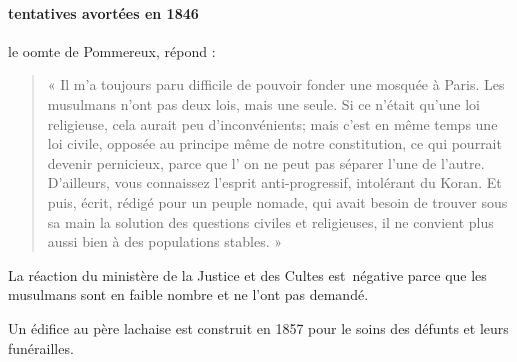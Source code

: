 \paragraph{tentatives avortées en 1846}
le oomte de Pommereux, répond : 
\begin{quote}
« Il m'a
toujours paru difficile de pouvoir fonder une mosquée à Paris. Les
musulmans n'ont pas deux lois, mais une seule. Si ce n'était
qu'une loi religieuse, cela aurait peu d'inconvénients; mais c'est
en même temps une loi civile, opposée au principe même de notre
constitution, ce qui pourrait devenir pernicieux, parce que l' on ne
peut pas séparer l'une de l'autre. D'ailleurs, vous connaissez
l'esprit anti-progressif, intolérant du Koran. Et puis, écrit, rédigé
pour un peuple nomade, qui avait besoin de trouver sous sa main
la solution des questions civiles et religieuses, il ne convient plus
aussi bien à des populations stables. »
\end{quote}
La réaction du ministère de la Justice et des Cultes est~négative parce que les musulmans sont en faible nombre et ne l'ont pas demandé.

Un édifice au père lachaise est construit en 1857 pour le soins des défunts et leurs funérailles.

